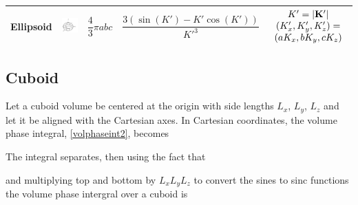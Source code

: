 \begin{table}[H]
\begin{center}
\begin{tabular}{|p{1.4cm}|p{3cm}|c|c|p{2.7cm}|}
Ellipsoid & \parbox[c]{1em}{\includegraphics[width=1.3in]{Smatrix/Figures/Ellipsoid}}  & $\dfrac{4}{3}\pi abc$ & $ \dfrac{3(\sin(K') - K' \cos(K'))}{K'^3}   $  & $\begin{array}{c} K' = \vert \mathbf{K'} \vert \\ (K_x',K_y',K_z') = \\ (a K_x, b K_y, c K_z)\end{array}$ \\   \hline
\end{tabular}
\end{center}
\label{tablevolphaseint}
\end{table}%


\subsection{Cuboid}

Let a cuboid volume be centered at the origin with side lengths $L_x$, $L_y$, $L_z$ and let it be aligned with the Cartesian axes. In Cartesian coordinates, the volume phase integral, \eqref{volphaseint2}, becomes

The integral separates, then using the fact that 

\noindent and multiplying top and bottom by $L_xL_yL_z$ to convert the sines to sinc functions the volume phase intergral over a cuboid is 


